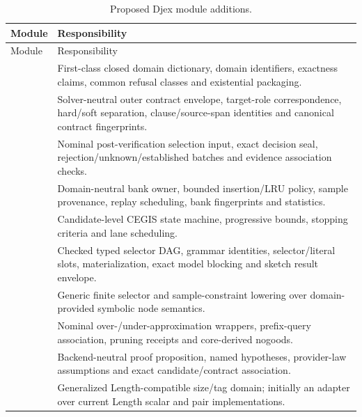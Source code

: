\documentclass[11pt,oneside]{report}
\begin{document}
\begin{longtable}{@{}L{0.43\textwidth}L{0.51\textwidth}@{}}
\caption{Proposed Djex module additions.}\label{tab:djex-modules}\\
\toprule
Module & Responsibility \\
\midrule
\endfirsthead
\toprule
Module & Responsibility \\
\midrule
\endhead
\bottomrule
\endfoot
{} & First-class closed domain dictionary, domain identifiers, exactness claims, common refusal classes and existential packaging. \\
 & Solver-neutral outer contract envelope, target-role correspondence, hard/soft separation, clause/source-span identities and canonical contract fingerprints. \\
 & Nominal post-verification selection input, exact decision seal, rejection/unknown/established batches and evidence association checks. \\
 & Domain-neutral bank owner, bounded insertion/LRU policy, sample provenance, replay scheduling, bank fingerprints and statistics. \\
 & Candidate-level CEGIS state machine, progressive bounds, stopping criteria and lane scheduling. \\
 & Checked typed selector DAG, grammar identities, selector/literal slots, materialization, exact model blocking and sketch result envelope. \\
 & Generic finite selector and sample-constraint lowering over domain-provided symbolic node semantics. \\
 & Nominal over-/under-approximation wrappers, prefix-query association, pruning receipts and core-derived nogoods. \\
 & Backend-neutral proof proposition, named hypotheses, provider-law assumptions and exact candidate/contract association. \\
 & Generalized Length-compatible size/tag domain; initially an adapter over current Length scalar and pair implementations. \\

\end{longtable}
\end{document}
